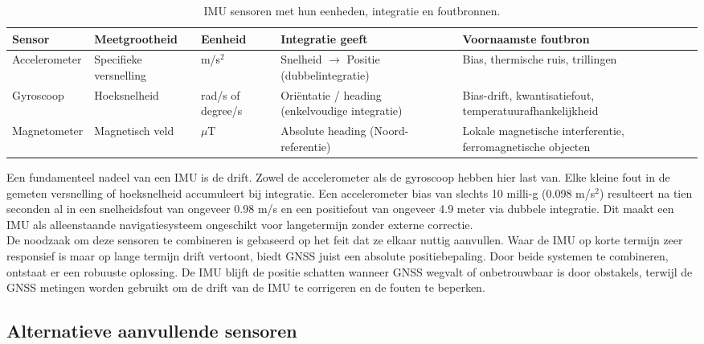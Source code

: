 \newpage

\begin{table}[htbp]
    \centering
    \renewcommand{\arraystretch}{1.3}
    \caption{IMU sensoren met hun eenheden, integratie en foutbronnen.}
    \label{tab:imu_sensoren}
    \begin{tabularx}{\textwidth}{|l|l|l|X|X|}
        \hline
        \rowcolor{green!20}
        \textbf{Sensor} & \textbf{Meetgrootheid} & \textbf{Eenheid} & \textbf{Integratie geeft} & \textbf{Voornaamste foutbron} \\ \hline
        Accelerometer & Specifieke versnelling & m/s$^2$ & Snelheid $\rightarrow$ Positie (dubbelintegratie) & Bias, thermische ruis, trillingen \\ \hline
        Gyroscoop     & Hoeksnelheid           & rad/s of degree/s   & Oriëntatie / heading (enkelvoudige integratie) & Bias-drift, kwantisatiefout, temperatuurafhankelijkheid \\ \hline
        Magnetometer  & Magnetisch veld        & $\mu$T  & Absolute heading (Noord-referentie) & Lokale magnetische interferentie, ferromagnetische objecten \\ \hline
    \end{tabularx}
\end{table}

Een fundamenteel nadeel van een IMU is de drift. Zowel de accelerometer als de gyroscoop hebben hier last van. Elke kleine fout in de gemeten versnelling of hoeksnelheid accumuleert bij integratie. Een accelerometer bias van slechts 10 milli-g (0.098 m/s$^2$) resulteert na tien seconden al in een snelheidsfout van ongeveer 0.98 m/s en een positiefout van ongeveer 4.9 meter via dubbele integratie. Dit maakt een IMU als alleenstaande navigatiesysteem ongeschikt voor langetermijn zonder externe correctie. \\

De noodzaak om deze sensoren te combineren is gebaseerd op het feit dat ze elkaar nuttig aanvullen. Waar de IMU op korte termijn zeer responsief is maar op lange termijn drift vertoont, biedt GNSS juist een absolute positiebepaling. Door beide systemen te combineren, ontstaat er een robuuste oplossing. De IMU blijft de positie schatten wanneer GNSS wegvalt of onbetrouwbaar is door obstakels, terwijl de GNSS metingen worden gebruikt om de drift van de IMU te corrigeren en de fouten te beperken. \\



\subsection{Alternatieve aanvullende sensoren}

